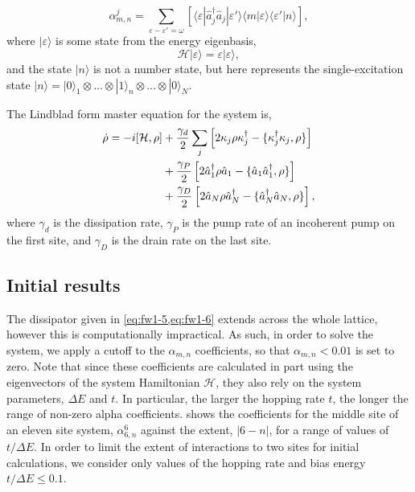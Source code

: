 \begin{equation}
	\alpha_{m,n}^{j} = \sum_{\varepsilon - \varepsilon' = \omega} \left[ \langle \varepsilon | \hat{a}_{j}^{\dagger}\hat{a}_{j} | \varepsilon' \rangle \langle m |\varepsilon \rangle \langle \varepsilon' | n \rangle \right],
	\label{eq:fw1-6}
\end{equation}
where \(|\varepsilon \rangle\) is some state from the energy eigenbasis,
\begin{equation}
	\mathcal{H}|\varepsilon \rangle = \varepsilon|\varepsilon\rangle,
	\label{eq:fw1-7}
\end{equation}
and the state \(|n\rangle\) is not a number state, but here represents the single-excitation state \(|n \rangle = | 0 \rangle_{1} \otimes \ldots \otimes | 1 \rangle_{n} \otimes \ldots \otimes |0 \rangle_{N}\).

The Lindblad form master equation for the system is,
\begin{align}
	\dot{\rho} = -i[\mathcal{H}, \rho] &+ \frac{\gamma_{d}}{2} \sum_{j} \left[2\kappa_{j}\rho\kappa_{j}^{\dagger} - \{\kappa_{j}^{\dagger}\kappa_{j}, \rho\}\right] \notag \\
	&+ \frac{\gamma_{P}}{2}\left[2\hat{a}_{1}^{\dagger}\rho\hat{a}_{1} - \{\hat{a}_{1}\hat{a}_{1}^{\dagger}, \rho\}\right] \notag \\
	&+ \frac{\gamma_{D}}{2}\left[2\hat{a}_{N}\rho\hat{a}_{N}^{\dagger} - \{\hat{a}_{N}^{\dagger}\hat{a}_{N}, \rho\}\right],
	\label{eq:fw1-2}
\end{align}
where \(\gamma_{d}\) is the dissipation rate, \(\gamma_{P}\) is the pump rate of an incoherent pump on the first site, and \(\gamma_{D}\) is the drain rate on the last site.

\subsection{Initial results}
The dissipator given in \cref{eq:fw1-5,eq:fw1-6} extends across the whole lattice, however this is computationally impractical. As such, in order to solve the system, we apply a cutoff to the \(\alpha_{m,n}\) coefficients, so that \(\alpha_{m,n} < 0.01\) is set to zero. Note that since these coefficients are calculated in part using the eigenvectors of the system Hamiltonian \(\mathcal{H}\), they also rely on the system parameters, \(\Delta E\) and \(t\). In particular, the larger the hopping rate \(t\), the longer the range of non-zero alpha coefficients.  shows the coefficients for the middle site of an eleven site system, \(\alpha_{6,n}^{6}\) against the extent, \(|6-n|\), for a range of values of \( t / \Delta E\). In order to limit the extent of interactions to two sites for initial calculations, we consider only values of the hopping rate and bias energy \(t / \Delta E \leq 0.1\).

